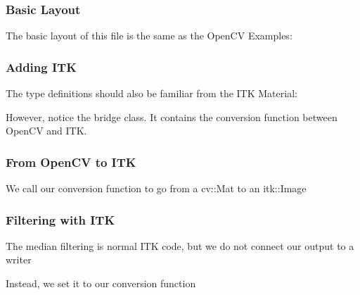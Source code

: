 \begin{frame}
\frametitle{Basic Layout}
\begin{center}
The basic layout of this file is the same as the OpenCV Examples:


\end{center}
\end{frame}

\begin{frame}
\frametitle{Adding ITK}
\begin{center}
The type definitions should also be familiar from the ITK Material:

However, notice the bridge class. It contains the conversion function
between OpenCV and ITK.

\end{center}
\end{frame}

\begin{frame}
\frametitle{From OpenCV to ITK}
\begin{center}
We call our conversion function to go from a cv::Mat to an itk::Image

\end{center}
\end{frame}

\begin{frame}
\frametitle{Filtering with ITK}
\begin{center}
The median filtering is normal ITK code, but we do not connect our
output to a writer

\pause
Instead, we set it to our conversion function

\end{center}
\end{frame}
